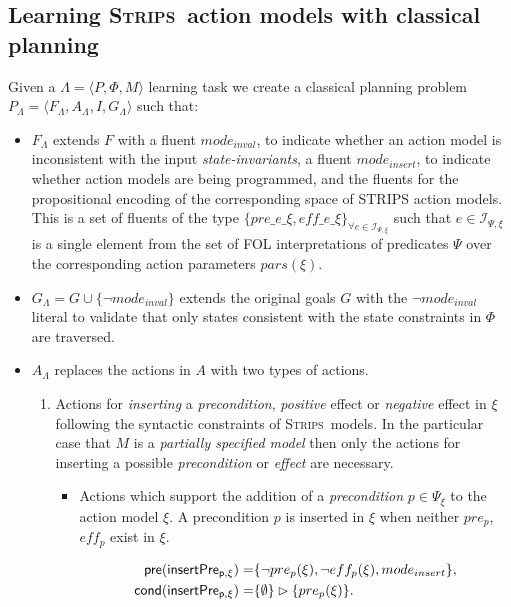 \documentclass{article}
\newcommand{\tup}[1]{{\langle #1 \rangle}}
\newcommand{\pre}{\mathsf{pre}}     %
\newcommand{\cond}{\mathsf{cond}}   %
\newcommand{\strips}{\textsc{Strips}}
\begin{document}
\subsection{Learning \strips\ action models with classical planning}
Given a $\Lambda=\tup{P,\Phi,M}$ learning task we create a classical planning problem $P_{\Lambda}=\tup{F_{\Lambda},A_{\Lambda},I,G_{\Lambda}}$ such that:
\begin{itemize}
\item $F_{\Lambda}$ extends $F$ with a fluent {\small$mode_{inval}$}, to indicate whether an action model is inconsistent with the input {\em state-invariants}, a fluent {\small$mode_{insert}$}, to indicate whether action models are being programmed, and the fluents for the propositional encoding of the corresponding space of STRIPS action models. This is a set of fluents of the type $\{pre\_e\_\xi, eff\_e\_\xi\}_{\forall e\in{\mathcal I}_{\Psi,\xi}}$ such that $e\in{\mathcal I}_{\Psi,\xi}$ is a single element from the set of FOL interpretations of predicates $\Psi$ over the corresponding action parameters $pars(\xi)$.

\item $G_{\Lambda}= G\cup \{\neg mode_{inval}\}$ extends the original goals $G$ with the $\neg mode_{inval}$ literal to validate that only states consistent with the state constraints in $\Phi$ are traversed.

\item $A_{\Lambda}$ replaces the actions in $A$ with two types of actions.
\begin{enumerate}
\item Actions for {\em inserting} a {\em precondition}, {\em positive} effect or {\em negative} effect in $\xi$ following the syntactic constraints of \strips\ models. In the particular case that $M$ is a {\em partially specified model} then only the actions for inserting a possible {\em precondition} or {\em effect} are necessary.
\begin{itemize}
\item Actions which support the addition of a {\em precondition} $p\in \Psi_{\xi}$ to the action model $\xi$. A precondition $p$ is inserted in $\xi$ when neither $pre_p$, $eff_p$ exist in $\xi$.

\begin{small}
\begin{align*}
\hspace*{7pt}\pre(\mathsf{insertPre_{p,\xi}})=&\{\neg pre_{p}(\xi), \neg eff_{p}(\xi), mode_{insert}\},\\
\cond(\mathsf{insertPre_{p,\xi}})=&\{\emptyset\}\rhd\{pre_{p}(\xi)\}.
\end{align*}
\end{small}


\end{itemize}
\end{enumerate}
\end{itemize}
\end{document}
